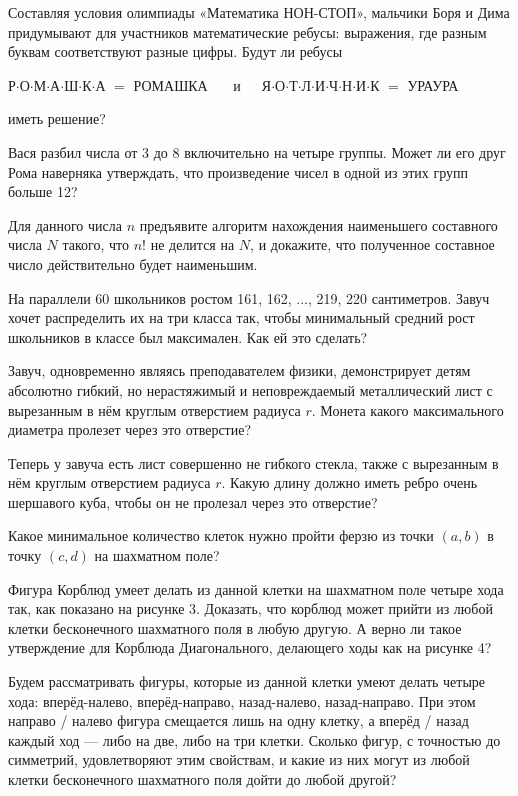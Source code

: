 \begin{itemize}
\itA Составляя условия олимпиады «Математика НОН-СТОП», мальчики Боря и Дима придумывают для участников математические ребусы: выражения, где разным буквам соответствуют разные цифры. Будут ли ребусы \smallskip \\
\centerline{Р$\cdot$О$\cdot$М$\cdot$А$\cdot$Ш$\cdot$К$\cdot$А $=$ РОМАШКА
\ \ \ и\ \ \ 
Я$\cdot$О$\cdot$Т$\cdot$Л$\cdot$И$\cdot$Ч$\cdot$Н$\cdot$И$\cdot$К $=$ УРАУРА} \smallskip
иметь решение?

\itB Вася разбил числа от 3 до 8 включительно на четыре группы. Может ли его друг Рома наверняка утверждать, что произведение чисел в одной из этих групп больше 12?

\itC Для данного числа $n$ предъявите алгоритм нахождения наименьшего составного числа $N$ такого, что $n!$ не делится на $N$, и докажите, что полученное составное число действительно будет наименьшим.
\end{itemize}

\begin{itemize}
\itA На параллели 60 школьников ростом 161, 162, ..., 219, 220 сантиметров. Завуч хочет распределить их на три класса так, чтобы минимальный средний рост школьников в классе был максимален. Как ей это сделать?

\itB Завуч, одновременно являясь преподавателем физики, демонстрирует детям абсолютно гибкий, но нерастяжимый и неповреждаемый металлический лист с вырезанным в нём круглым отверстием радиуса $r$. Монета какого максимального диаметра пролезет через это отверстие?

\itC Теперь у завуча есть лист совершенно не гибкого стекла, также с вырезанным в нём круглым отверстием радиуса $r$. Какую длину должно иметь ребро очень шершавого куба, чтобы он не пролезал через это отверстие?
\end{itemize}

\begin{itemize}
\itA Какое минимальное количество клеток нужно пройти ферзю из точки $(a,b)$ в точку $(c,d)$ на шахматном поле?

\itB Фигура Корблюд умеет делать из данной клетки на шахматном поле четыре хода так, как показано на рисунке 3. Доказать, что корблюд может прийти из любой клетки бесконечного шахматного поля в любую другую. А верно ли такое утверждение для Корблюда Диагонального, делающего ходы как на рисунке 4?

\itC Будем рассматривать фигуры, которые из данной клетки умеют делать четыре хода: вперёд-налево, вперёд-направо, назад-налево, назад-направо. При этом направо / налево фигура смещается лишь на одну клетку, а вперёд / назад каждый ход — либо на две, либо на три клетки. Сколько фигур, с точностью до симметрий, удовлетворяют этим свойствам, и какие из них могут из любой клетки бесконечного шахматного поля дойти до любой другой?
\end{itemize}

